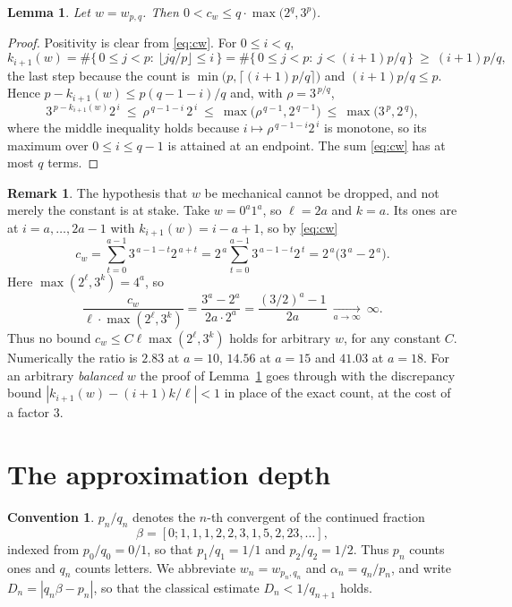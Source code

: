 \documentclass[11pt,reqno]{amsart}
\theoremstyle{plain}
\newtheorem{lemma}[theorem]{Lemma}
\theoremstyle{definition}
\newtheorem{remark}[theorem]{Remark}
\newtheorem{convention}[theorem]{Convention}
\begin{document}
\begin{lemma}\label{lem:height}
Let $w=w_{p,q}$. Then $0<c_w\le q\cdot\max\bigl(2^{q},3^{p}\bigr)$.
\end{lemma}

\begin{proof}
Positivity is clear from \eqref{eq:cw}. For $0\le i<q$,
\[
k_{i+1}(w)=\#\{\,0\le j<p:\ \lfloor jq/p\rfloor\le i\,\}
=\#\{\,0\le j<p:\ j<(i+1)p/q\,\}\ \ge\ (i+1)p/q ,
\]
the last step because the count is $\min\bigl(p,\lceil (i+1)p/q\rceil\bigr)$ and
$(i+1)p/q\le p$. Hence $p-k_{i+1}(w)\le p(q-1-i)/q$ and, with
$\rho=3^{\,p/q}$,
\[
3^{\,p-k_{i+1}(w)}2^{\,i}\ \le\ \rho^{\,q-1-i}\,2^{\,i}\ \le\ \max\bigl(\rho^{\,q-1},2^{\,q-1}\bigr)
\ \le\ \max\bigl(3^{\,p},2^{\,q}\bigr),
\]
where the middle inequality holds because $i\mapsto\rho^{\,q-1-i}2^{\,i}$ is
monotone, so its maximum over $0\le i\le q-1$ is attained at an endpoint. The sum
\eqref{eq:cw} has at most $q$ terms.
\end{proof}

\begin{remark}\label{rem:unbalanced}
The hypothesis that $w$ be mechanical cannot be dropped, and not merely the
constant is at stake. Take $w=0^{a}1^{a}$, so $\ell=2a$ and $k=a$. Its ones are
at $i=a,\dots,2a-1$ with $k_{i+1}(w)=i-a+1$, so by \eqref{eq:cw}
\[
c_w=\sum_{t=0}^{a-1}3^{\,a-1-t}2^{\,a+t}=2^{\,a}\sum_{t=0}^{a-1}3^{\,a-1-t}2^{\,t}
 =2^{\,a}\bigl(3^{\,a}-2^{\,a}\bigr).
\]
Here $\max(2^{\ell},3^{k})=4^{a}$, so
\[
\frac{c_w}{\ell\cdot\max(2^{\ell},3^{k})}=\frac{3^{a}-2^{a}}{2a\cdot 2^{a}}
=\frac{(3/2)^{a}-1}{2a}\ \xrightarrow[a\to\infty]{}\ \infty .
\]
Thus no bound $c_w\le C\ell\max(2^{\ell},3^{k})$ holds for arbitrary $w$, for any
constant $C$. Numerically the ratio is $2.83$ at $a=10$, $14.56$ at $a=15$ and
$41.03$ at $a=18$. For an arbitrary \emph{balanced} $w$ the proof of
Lemma~\ref{lem:height} goes through with the discrepancy bound
$|k_{i+1}(w)-(i+1)k/\ell|<1$ in place of the exact count, at the cost of a factor
$3$.
\end{remark}

\section{The approximation depth}\label{sec:depth}

\begin{convention}\label{conv:conv}
$p_n/q_n$ denotes the $n$-th convergent of the continued fraction
\[
\beta=[0;1,1,1,2,2,3,1,5,2,23,\dots],
\]
indexed from $p_0/q_0=0/1$, so that $p_1/q_1=1/1$ and $p_2/q_2=1/2$. Thus $p_n$
counts ones and $q_n$ counts letters.
We abbreviate $w_n=w_{p_n,q_n}$ and $\alpha_n=q_n/p_n$, and write
$D_n=|q_n\beta-p_n|$, so that the classical estimate $D_n<1/q_{n+1}$ holds.
\end{convention}
\end{document}
